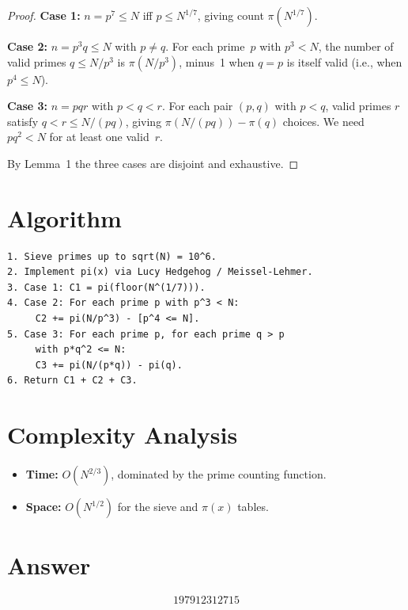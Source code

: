 \documentclass[12pt]{article}
\begin{document}
\begin{proof}
\textbf{Case 1:} $n = p^7 \le N$ iff $p \le N^{1/7}$, giving count $\pi(N^{1/7})$.

\textbf{Case 2:} $n = p^3 q \le N$ with $p \ne q$. For each prime~$p$ with $p^3 < N$, the number of valid primes $q \le N/p^3$ is $\pi(N/p^3)$, minus~1 when $q = p$ is itself valid (i.e., when $p^4 \le N$).

\textbf{Case 3:} $n = pqr$ with $p < q < r$. For each pair $(p,q)$ with $p < q$, valid primes $r$ satisfy $q < r \le N/(pq)$, giving $\pi(N/(pq)) - \pi(q)$ choices. We need $pq^2 < N$ for at least one valid~$r$.

By Lemma~1 the three cases are disjoint and exhaustive.
\end{proof}

\section{Algorithm}
\begin{verbatim}
1. Sieve primes up to sqrt(N) = 10^6.
2. Implement pi(x) via Lucy Hedgehog / Meissel-Lehmer.
3. Case 1: C1 = pi(floor(N^(1/7))).
4. Case 2: For each prime p with p^3 < N:
     C2 += pi(N/p^3) - [p^4 <= N].
5. Case 3: For each prime p, for each prime q > p
     with p*q^2 <= N:
     C3 += pi(N/(p*q)) - pi(q).
6. Return C1 + C2 + C3.
\end{verbatim}

\section{Complexity Analysis}
\begin{itemize}
    \item \textbf{Time:} $O(N^{2/3})$, dominated by the prime counting function.
    \item \textbf{Space:} $O(N^{1/2})$ for the sieve and $\pi(x)$ tables.
\end{itemize}

\section{Answer}

\[
\boxed{197912312715}
\]
\end{document}
